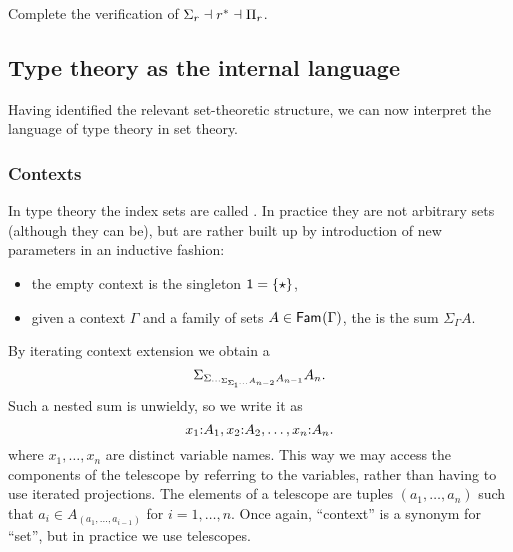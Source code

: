 \begin{exercise}
  Complete the verification of $\Sigma_r \dashv r^{*} \dashv \Pi_r$.
\end{exercise}

\subsection{Type theory as the internal language}
\label{sec:interpr-type-theory}

Having identified the relevant set-theoretic structure, we can now interpret the language of type theory in set theory.

\subsubsection{Contexts}
\label{sec:contexts}

In type theory the index sets are called . In practice they are not arbitrary sets (although they can be), but are rather built up by introduction of new parameters in an inductive fashion:
%
\begin{itemize}
\item the empty context is the singleton $\mathsf{1} = \{\star\}$,
\item given a context $\Gamma$ and a family of sets $A \in \mathsf{Fam}_{}(\Gamma)$, the  is the sum $\Sigma_\Gamma A$.
\end{itemize}

By iterating context extension we obtain a 
%
\begin{equation*}
  \Sigma_{\Sigma_{\cdots \Sigma_{\Sigma_{\mathsf{1}} \cdots} A_{n-2}} A_{n-1}} A_n.
\end{equation*}
%
Such a nested sum is unwieldy, so we write it as
%
\begin{equation*}
  x_1 {:} A_1, x_2 {:} A_2, \ldots, x_n {:} A_n.
\end{equation*}
%
where $x_1, \ldots, x_n$ are distinct variable names. This way we may access the components of the telescope by referring to the variables, rather than having to use iterated projections.
%
The elements of a telescope are tuples $(a_1, \ldots, a_n)$ such that $a_i \in A_{(a_1, \ldots, a_{i-1})}$ for $i = 1, \ldots, n$.
%
Once again, ``context'' is a synonym for ``set'', but in practice we use telescopes.

